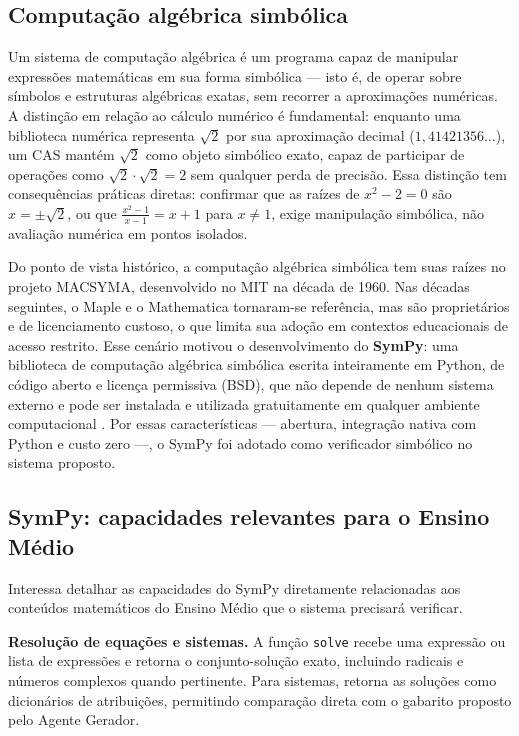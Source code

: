 \subsection{Computação algébrica simbólica}
\label{sub:cas-conceito}

Um sistema de computação algébrica é um programa capaz de manipular expressões matemáticas em sua
forma simbólica --- isto é, de operar sobre símbolos e estruturas algébricas exatas, sem recorrer a
aproximações numéricas. A distinção em relação ao cálculo numérico é fundamental: enquanto uma
biblioteca numérica representa $\sqrt{2}$ por sua aproximação decimal ($1{,}41421356\ldots$), um CAS
mantém $\sqrt{2}$ como objeto simbólico exato, capaz de participar de operações como
$\sqrt{2}\cdot\sqrt{2}=2$ sem qualquer perda de precisão. Essa distinção tem consequências práticas
diretas: confirmar que as raízes de $x^2-2=0$ são $x=\pm\sqrt{2}$, ou que $\frac{x^2-1}{x-1}=x+1$ para
$x\neq 1$, exige manipulação simbólica, não avaliação numérica em pontos isolados.

Do ponto de vista histórico, a computação algébrica simbólica tem suas raízes no projeto MACSYMA,
desenvolvido no MIT na década de 1960. Nas décadas seguintes, o Maple e o Mathematica tornaram-se
referência, mas são proprietários e de licenciamento custoso, o que limita sua adoção em contextos
educacionais de acesso restrito. Esse cenário motivou o desenvolvimento do \textbf{SymPy}: uma
biblioteca de computação algébrica simbólica escrita inteiramente em Python, de código aberto e
licença permissiva (BSD), que não depende de nenhum sistema externo e pode ser instalada e utilizada
gratuitamente em qualquer ambiente computacional \citep{meurer2017sympy}. Por essas características
--- abertura, integração nativa com Python e custo zero ---, o SymPy foi adotado como verificador
simbólico no sistema proposto.

\subsection{SymPy: capacidades relevantes para o Ensino Médio}
\label{sub:sympy}

Interessa detalhar as capacidades do SymPy diretamente relacionadas aos conteúdos matemáticos do
Ensino Médio que o sistema precisará verificar.

\textbf{Resolução de equações e sistemas.} A função \texttt{solve} recebe uma expressão ou lista de
expressões e retorna o conjunto-solução exato, incluindo radicais e números complexos quando
pertinente. Para sistemas, retorna as soluções como dicionários de atribuições, permitindo comparação
direta com o gabarito proposto pelo Agente Gerador.


